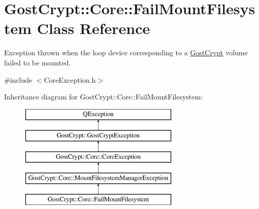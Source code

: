 \hypertarget{class_gost_crypt_1_1_core_1_1_fail_mount_filesystem}{}\section{Gost\+Crypt\+:\+:Core\+:\+:Fail\+Mount\+Filesystem Class Reference}
\label{class_gost_crypt_1_1_core_1_1_fail_mount_filesystem}


Exception thrown when the loop device corresponding to a \hyperlink{namespace_gost_crypt}{Gost\+Crypt} volume failed to be mounted.  




{\ttfamily \#include $<$Core\+Exception.\+h$>$}

Inheritance diagram for Gost\+Crypt\+:\+:Core\+:\+:Fail\+Mount\+Filesystem\+:\begin{figure}[H]
\begin{center}
\leavevmode
\includegraphics[height=5.000000cm]{class_gost_crypt_1_1_core_1_1_fail_mount_filesystem}
\end{center}
\end{figure}
